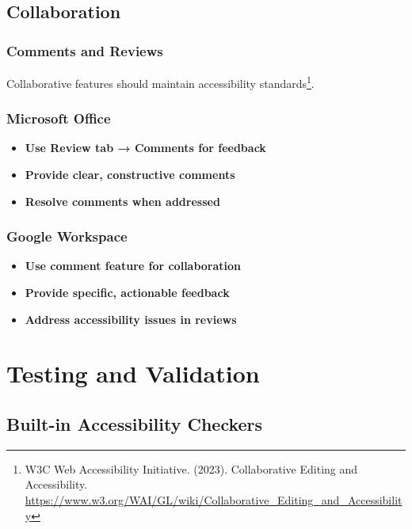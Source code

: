 \subsection{Collaboration}

\subsubsection{Comments and Reviews}
Collaborative features should maintain accessibility standards\footnote{W3C Web Accessibility Initiative. (2023). Collaborative Editing and Accessibility. \url{https://www.w3.org/WAI/GL/wiki/Collaborative_Editing_and_Accessibility}}.

\subsubsection{Microsoft Office}
\vspace{1em}
\begin{itemize}
\item \textbf{Use Review tab → Comments for feedback}
\item \textbf{Provide clear, constructive comments}
\item \textbf{Resolve comments when addressed}
\end{itemize}
\vspace{1em}

\subsubsection{Google Workspace}
\vspace{1em}
\begin{itemize}
\item \textbf{Use comment feature for collaboration}
\item \textbf{Provide specific, actionable feedback}
\item \textbf{Address accessibility issues in reviews}
\end{itemize}
\vspace{1em}

\section{Testing and Validation}
\label{sec:testing-validation}

\subsection{Built-in Accessibility Checkers}

